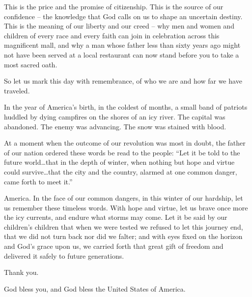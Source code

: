 This is the price and the promise of citizenship. This is the source of our confidence – the knowledge that God calls on us to shape an uncertain destiny. 
This is the meaning of our liberty and our creed – why men and women and children of every race and every faith can join in celebration across this 
magnificent mall, and why a man whose father less than sixty years ago might not have been served at a local restaurant can now stand before you to take 
a most sacred oath.

So let us mark this day with remembrance, of who we are and how far we have traveled.


In the year of America’s birth, in the coldest of months, a small band of patriots huddled by dying campfires on the shores of an icy river. The capital was 
abandoned. The enemy was advancing. The snow was stained with blood.

At a moment when the outcome of our revolution was most in doubt, the father of our nation ordered these words be read to the people: “Let it be told 
to the future world…that in the depth of winter, when nothing but hope and virtue could survive…that the city and the country, alarmed at one common 
danger, came forth to meet it.”

America. In the face of our common dangers, in this winter of our hardship, let us remember these timeless words. With hope and virtue, let us brave 
once more the icy currents, and endure what storms may come. Let it be said by our children’s children that when we were tested we refused to let this 
journey end, that we did not turn back nor did we falter; and with eyes fixed on the horizon and God’s grace upon us, we carried forth that great gift 
of freedom and delivered it safely to future generations.

Thank you.


God bless you, and God bless the United States of America.